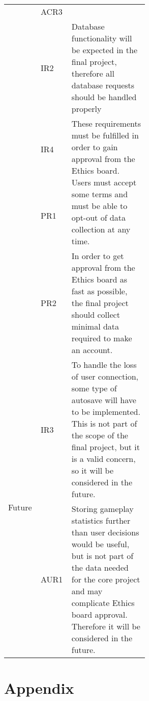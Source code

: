 \documentclass{article}
\begin{document}
\begin{table}[H]
\begin{adjustwidth}{-1.6in}{-1in}
\begin{tabular}{|l|l|p{0.55\linewidth}|}
                                 & ACR3                  &                                                                                                                                                                                                                                 \\ \cline{2-3} 
                                 & IR2                   & Database functionality will be expected in the final project, therefore all database requests should be handled properly                                                                                                        \\ \cline{2-3}
                                 & IR4                   & \multirow{2}{\linewidth}{These requirements must be fulfilled in order to gain approval from the Ethics board. Users must accept some terms and must be able to opt-out of data collection at any time.} \\ \cline{2-2}
                                 & PR1                   &                                                                                                                                                                                                                                 \\ \cline{2-3} 
                                 & PR2                   & In order to get approval from the Ethics board as fast as possible, the final project should collect minimal data required to make an account.                                                                                  \\ \hline
\multirow{2}{*}{Future}          & IR3                   & To handle the loss of user connection, some type of autosave will have to be implemented. This is not part of the scope of the final project, but it is a valid concern, so it will be considered in the future.                    \\ \cline{2-3} 
                                 & AUR1                  & Storing gameplay statistics further than user decisions would be useful, but is not part of the data needed for the core project and may complicate Ethics board approval. Therefore it will be considered in the future.      \\ \hline
\end{tabular}
\end{adjustwidth}
\end{table}

\section{Appendix}
\end{document}
